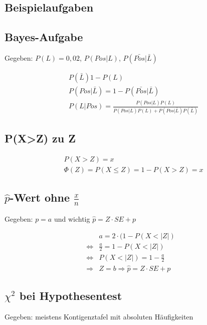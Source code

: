 \documentclass[10pt,a4paper,landscape]{article}
\begin{document}
\begin{multicols}{4}

\section{Beispielaufgaben}

\subsection{Bayes-Aufgabe}
Gegeben: $P(L) = 0,02$, $P(Pos|L)$, $P(\bar{Pos}|\bar{L})$

\begin{align*}
& P (\bar{L}) 1 - P(L) \\
& P (Pos|\bar{L}) = 1 - P(\bar{Pos}|\bar{L}) \\
& P (L|Pos) = \frac{P(Pos|L)P(L)}{P(Pos|L)P(L)+P(Pos|\bar{L})P(\bar{L})}
\end{align*}

\subsection{P(X>Z) zu Z}
\begin{align*}
& P(X > Z) = x\\
& \Phi(Z) = P(X \leq Z) = 1- P(X > Z) = x
\end{align*}

\subsection{$\hat{p}$-Wert ohne $\frac{x}{n}$}
Gegeben: $p = a$ und wichtig $\hat{p} = Z \cdot SE + p$

\begin{align*}
& a = 2 \cdot (1 - P(X < |Z|) \\
\Leftrightarrow & \frac{a}{2} = 1 - P(X < |Z|) \\
\Leftrightarrow & P(X < |Z|) = 1 - \frac{a}{2} \\
\Rightarrow & Z = b \Rightarrow \hat{p} = Z \cdot SE +p
\end{align*}

\subsection{$\chi^2$ bei Hypothesentest}
Gegeben: meistens Kontigenztafel mit absoluten Häufigkeiten


\end{multicols}
\end{document}
